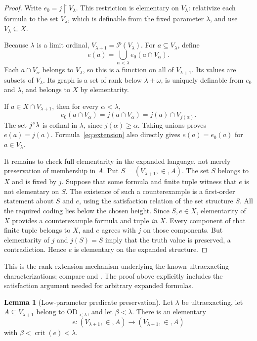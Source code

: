 \documentclass[11pt,letterpaper]{article}
\theoremstyle{definition}
\newtheorem{lemma}[definition]{Lemma}
\numberwithin{equation}{section}
\newcommand{\OD}{\mathrm{OD}}
\newcommand{\crit}{\operatorname{crit}}
\newcommand{\Pow}{\mathcal P}
\newcommand{\restr}{\mathbin{\upharpoonright}}
\newcommand{\ODlo}{\OD_{<\lambda}}
\begin{document}
\begin{proof}
Write $e_0=j\restr V_\lambda$. This restriction is elementary on $V_\lambda$: relativize each formula to the set $V_\lambda$, which is definable from the fixed parameter $\lambda$, and use $V_\lambda\subseteq X$.

Because $\lambda$ is a limit ordinal, $V_{\lambda+1}=\Pow(V_\lambda)$. For $a\subseteq V_\lambda$, define
\begin{equation}\label{eq:extension}
e(a)=\bigcup_{\alpha<\lambda}e_0(a\cap V_\alpha).
\end{equation}
Each $a\cap V_\alpha$ belongs to $V_\lambda$, so this is a function on all of $V_{\lambda+1}$. Its values are subsets of $V_\lambda$. Its graph is a set of rank below $\lambda+\omega$, is uniquely definable from $e_0$ and $\lambda$, and belongs to $X$ by elementarity.

If $a\in X\cap V_{\lambda+1}$, then for every $\alpha<\lambda$,
\[
e_0(a\cap V_\alpha)=j(a\cap V_\alpha)
=j(a)\cap V_{j(\alpha)}.
\]
The set $j``\lambda$ is cofinal in $\lambda$, since $j(\alpha)\ge\alpha$. Taking unions proves $e(a)=j(a)$. Formula~\eqref{eq:extension} also directly gives $e(a)=e_0(a)$ for $a\in V_\lambda$.

It remains to check full elementarity in the expanded language, not merely preservation of membership in $A$. Put $S=(V_{\lambda+1},\in,A)$. The set $S$ belongs to $X$ and is fixed by $j$. Suppose that some formula and finite tuple witness that $e$ is not elementary on $S$. The existence of such a counterexample is a first-order statement about $S$ and $e$, using the satisfaction relation of the set structure $S$. All the required coding lies below the chosen height. Since $S,e\in X$, elementarity of $X$ provides a counterexample formula and tuple \emph{in $X$}. Every component of that finite tuple belongs to $X$, and $e$ agrees with $j$ on those components. But elementarity of $j$ and $j(S)=S$ imply that the truth value is preserved, a contradiction. Hence $e$ is elementary on the expanded structure.
\end{proof}

This is the rank-extension mechanism underlying the known ultraexacting characterizations; compare \cite[Lemma~3.7]{abl} and \cite[Theorem~3.1]{abgl}. The proof above explicitly includes the satisfaction argument needed for arbitrary expanded formulas.

\begin{lemma}[Low-parameter predicate preservation]\label{lem:predicate}
Let $\lambda$ be ultraexacting, let $A\subseteq V_{\lambda+1}$ belong to $\ODlo$, and let $\beta<\lambda$. There is an elementary
\[
e:(V_{\lambda+1},\in,A)\longrightarrow(V_{\lambda+1},\in,A)
\]
with $\beta<\crit(e)<\lambda$.
\end{lemma}
\end{document}
